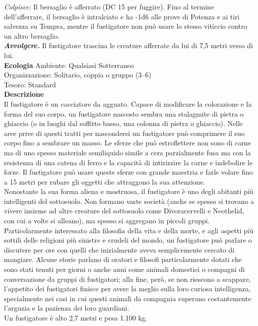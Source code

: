 \begin{multicols}{2}
\emph{Colpisce:} Il bersaglio è afferrato (DC 15 per fuggire). Fino al termine dell'afferrare, il bersaglio è intralciato e ha -1d6 alle prove di Potenza e ai tiri salvezza su Tempra, mentre il fustigatore non può usare lo stesso viticcio contro un altro bersaglio.\\
\emph{\textbf{Avvolgere.}} Il fustigatore trascina le creature afferrate da lui di 7,5 metri verso di lui.\\
\textbf{Ecologia}
Ambiente: Qualsiasi Sotterraneo\\
Organizzazione: Solitario, coppia o gruppo (3–6)\\
Tesoro: Standard\\
\textbf{Descrizione}\\
Il fustigatore è un cacciatore da agguato. Capace di modificare la colorazione e la forma del suo corpo, un fustigatore nascosto sembra una stalagmite di pietra o ghiaccio (o in luoghi dal soffitto basso, una colonna di pietra o ghiaccio). Nelle aree prive di questi tratti per nascondersi un fustigatore può comprimere il suo corpo fino a sembrare un masso. Le sferze che può estroflettere non sono di carne ma di uno spesso materiale semiliquido simile a cera parzialmente fusa ma con la resistenza di una catena di ferro e la capacità di intirizzire la carne e indebolire le forze. Il fustigatore può usare queste sferze con grande maestria e farle volare fino a 15 metri per rubare gli oggetti che attraggono la sua attenzione.\\

Nonostante la sua forma aliena e mostruosa, il fustigatore è uno degli abitanti più intelligenti del sottosuolo. Non formano vaste società (anche se spesso si trovano a vivere insieme ad altre creature del sottosuolo come Divoracervelli e Neothelid, con cui a volte si alleano), ma spesso si aggregano in piccoli gruppi. Particolarmente interessato alla filosofia della vita e della morte, e agli aspetti più sottili delle religioni più sinistre e crudeli del mondo, un fustigatore può parlare o discutere per ore con quelli che inizialmente aveva semplicemente cercato di mangiare. Alcune storie parlano di oratori e filosofi particolarmente dotati che sono stati tenuti per giorni o anche anni come animali domestici o compagni di conversazione da gruppi di fustigatori; alla fine, però, se non riescono a scappare, l’appetito dei fustigatori finisce per avere la meglio sulla loro curiosa intelligenza, specialmente nei casi in cui questi animali da compagnia superano costantemente l’arguzia e la pazienza dei loro guardiani.\\
Un fustigatore è alto 2,7 metri e pesa 1.100 kg.\\


\end{multicols}
